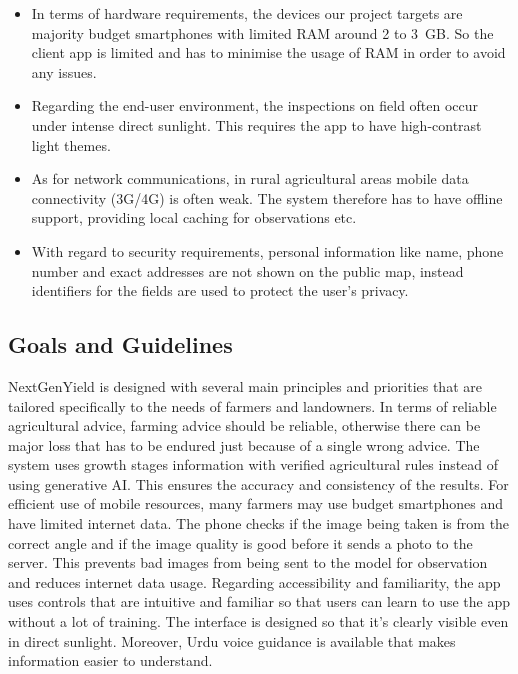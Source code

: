 \documentclass{FastFyp}
\begin{document}
\begin{itemize}
    \item In terms of hardware requirements, the devices our project targets
    are majority budget smartphones with limited RAM around 2 to 3~GB. So the
    client app is limited and has to minimise the usage of RAM in order to
    avoid any issues.

    \item Regarding the end-user environment, the inspections on field often
    occur under intense direct sunlight. This requires the app to have
    high-contrast light themes.

    \item As for network communications, in rural agricultural areas mobile
    data connectivity (3G/4G) is often weak. The system therefore has to have
    offline support, providing local caching for observations etc.

    \item With regard to security requirements, personal information like
    name, phone number and exact addresses are not shown on the public map,
    instead identifiers for the fields are used to protect the user's privacy.
\end{itemize}

\subsection{Goals and Guidelines}
NextGenYield is designed with several main principles and priorities that are
tailored specifically to the needs of farmers and landowners. In terms of reliable agricultural advice, farming advice should be reliable, otherwise there can be major loss that has to be endured just because of a single wrong advice. The system uses growth stages information with verified agricultural rules instead of using generative AI. This ensures the accuracy and consistency of the results.
For efficient use of mobile resources, many farmers may use budget smartphones
and have limited internet data. The phone checks if the image being taken is
from the correct angle and if the image quality is good before it sends a
photo to the server. This prevents bad images from being sent to the model for
observation and reduces internet data usage. Regarding accessibility and familiarity, the app uses controls that are intuitive and familiar so that users can learn to use the app without a lot of training. The interface is designed so that it's clearly visible even in direct sunlight. Moreover, Urdu voice guidance is available that makes information easier to understand.
 
\end{document}
